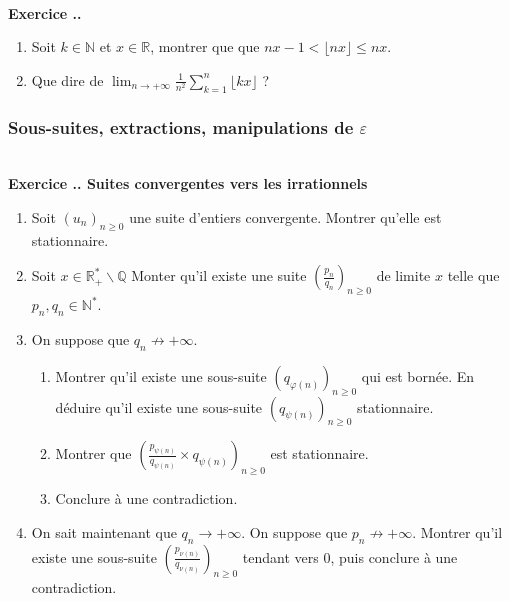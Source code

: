 \documentclass{article}
\newcommand{\mb}[1]{\mathbb{#1}}
\newcounter{exo}
\newcommand{\exercice}[1][\null]{\textbf{\\ Exercice \thesection.\theexo. #1} \addtocounter{exo}{1}}
\begin{document}
\exercice

\begin{enumerate}

\item Soit $k \in \mb{N}$ et $x \in \mb{R}$, montrer que que $nx -1 < \lfloor nx \rfloor \le nx$.

\item Que dire de $\displaystyle \lim_{n \to + \infty} \frac{1}{n^2} \sum_{k=1}^n \lfloor kx \rfloor$ ?
\end{enumerate}



\subsubsection{Sous-suites, extractions, manipulations de $\varepsilon$}



\exercice[Suites convergentes vers les irrationnels]

\begin{enumerate}

\item Soit $(u_n)_{n \ge 0}$ une suite d'entiers convergente. Montrer qu'elle est stationnaire.

\item Soit $x\in \mb{R}^*_+ \smallsetminus \mb{Q}$ Monter qu'il existe une suite $\left(\frac{p_n}{q_n}\right)_{n \ge 0}$ de limite $x$ telle que $p_n, q_n \in \mb{N}^*$.

\item On suppose que $q_n \not \rightarrow + \infty$.

\begin{enumerate}

\item Montrer qu'il existe une sous-suite $(q_{\varphi(n)})_{n \ge 0}$ qui est bornée. En déduire qu'il existe une sous-suite $(q_{\psi(n)})_{n \ge 0}$ stationnaire.

\item Montrer que $\left(\frac{p_{\psi(n)}}{q_{\psi(n)}} \times q_{\psi(n)}\right)_{n \ge 0}$ est stationnaire.

\item Conclure à une contradiction.
\end{enumerate}

\item On sait maintenant que $q_n \to + \infty$. On suppose que $p_n \not \rightarrow + \infty$. Montrer qu'il existe une sous-suite $\left(\frac{p_{\nu(n)}}{q_{\nu(n)}}\right)_{n \ge 0}$ tendant vers $0$, puis conclure à une contradiction.

\end{enumerate}
\end{document}
